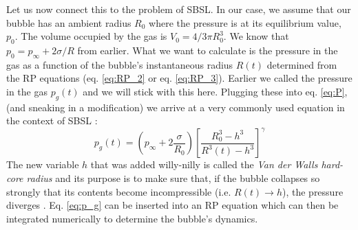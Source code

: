 \documentclass[prb,aps,nofootinbib,superscriptaddress,floatfix]{revtex4-2}
\begin{document}
Let us now connect this to the problem of SBSL. In our case, we assume that our bubble has an ambient radius $R_0$ where the pressure is at its equilibrium value, $p_0$. The volume occupied by the gas is $V_0 =  4/3 \pi R_0^3$. We know that $p_0=p_\infty+2\sigma /R$ from earlier. What we want to calculate is the pressure in the gas as a function of the bubble's instantaneous radius $R(t)$ determined from the RP equations (eq. \ref{eq:RP_2} or eq. \ref{eq:RP_3}). Earlier we called the pressure in the gas $p_g(t)$ and we will stick with this here. Plugging these into eq. \ref{eq:P}, (and sneaking in a modification) we arrive at a very commonly used equation in the context of SBSL \cite{brenner2002single,lofstedt1995sonoluminescing,barber1997defining,lofstedt1993toward,hilgenfeldt1999simple}:
\begin{equation}
    p_g(t) = \left( p_\infty+2\frac{\sigma}{R_0} \right) \left[ \frac{R_0^3-h^3}{R^3(t)-h^3} \right] ^ \gamma
    \label{eq:p_g}
\end{equation}
The new variable $h$ that was added willy-nilly is called the \emph{Van der Walls hard-core radius} and its purpose is to make sure that, if the bubble collapses so strongly that its contents become incompressible (i.e. $R(t)\rightarrow h$), the pressure diverges \cite{lofstedt1993toward,brenner2002single}. Eq. \ref{eq:p_g} can be inserted into an RP equation which can then be integrated numerically to determine the bubble's dynamics. 
\end{document}
